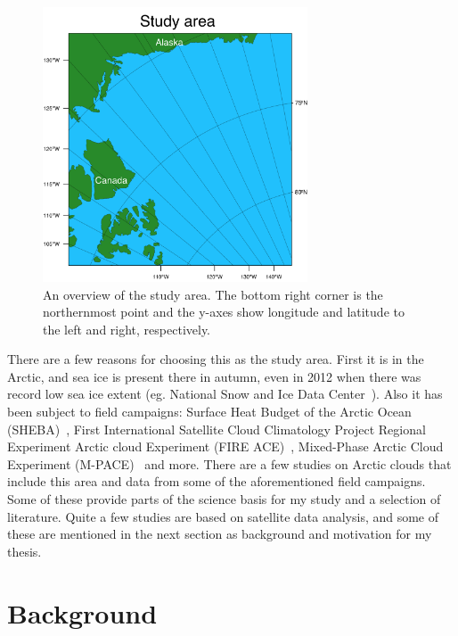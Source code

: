 \begin{figure}
\centering
\includegraphics[width=0.7\textwidth]{introduction/studyarea.png}
\caption{An overview of the study area. The bottom right corner is the northernmost point and the y-axes show longitude and latitude to the left and right, respectively.}
\label{fig:area}
\end{figure}
 
There are a few reasons for choosing this as the study area. First it is in the Arctic, and sea ice is present there in autumn, even in 2012 when there was record low sea ice extent (eg. National Snow and Ice Data Center~\citep{NSIDC}). Also it has been subject to field campaigns: Surface Heat Budget of the Arctic Ocean (SHEBA)~\citep{Uttal2002}, First International Satellite Cloud Climatology Project Regional Experiment Arctic cloud Experiment (FIRE ACE)~\citep{Curry2000}, Mixed-Phase Arctic Cloud Experiment (M-PACE)~\citep{Verlinde2007} and more. There are a few studies on Arctic clouds that include this area and data from some of the aforementioned field campaigns. Some of these provide parts of the science basis for my study and a selection of literature. Quite a few studies are based on satellite data analysis, and some of these are mentioned in the next section as background and motivation for my thesis.

\section{Background}
\label{sec:background}

